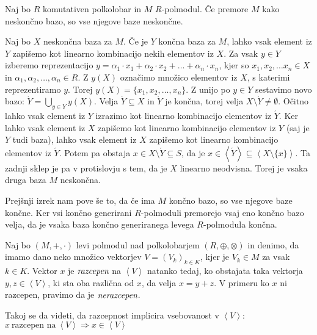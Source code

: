 \documentclass[mat1]{fmfdelo}
\newcommand{\pojem}[1]{\ensuremath{\emph{#1}}}
\newcommand{\Gen}[1]{\ensuremath{\left<{#1}\right>}}
\begin{document}
\begin{izrek}
	Naj bo $R$ komutativen polkolobar in $M$ $R$-polmodul. Če premore $M$ kako neskončno bazo, so vse njegove baze neskončne.
\end{izrek}
\begin{dokaz}
	Naj bo $X$ neskončna baza za $M$. Če je $Y$ končna baza za $M$, lahko vsak element iz $Y$ zapišemo kot linearno kombinacijo nekih elementov iz $X$. Za vsak $y\in Y$ izberemo reprezentacijo $y = \alpha_1\cdot x_1 + \alpha_2\cdot x_2 + \ldots + \alpha_n\cdot x_n$, kjer so $x_1, x_2, \ldots x_n \in X$ in $\alpha_1, \alpha_2, \ldots, \alpha_n \in R$. Z $y(X)$ označimo množico elementov iz $X$, s katerimi reprezentiramo $y$. Torej $y(X) = \{x_1, x_2, \ldots, x_n\}$. Z unijo po $y\in Y$ sestavimo novo bazo: $\acute{Y} = \bigcup_{y\in Y}y(X)$. Velja $\acute{Y} \subseteq X$ in $\acute{Y}$ je končna, torej velja $X\setminus\acute{Y}\neq\emptyset$. Očitno lahko vsak element iz $Y$ izrazimo kot linearno kombinacijo elementov iz $\acute{Y}$. Ker lahko vsak element iz $X$ zapišemo kot linearno kombinacijo elementov iz $Y$ (saj je $Y$ tudi baza), lahko vsak element iz $X$ zapišemo kot linearno kombinacijo elementov iz $\acute{Y}$. Potem pa obstaja $x\in X\setminus\acute{Y} \subseteq S$, da je $x\in \Gen{\acute{Y}}\subseteq\Gen{X\setminus\{x\}}$. Ta zadnji sklep je pa v protislovju s tem, da je $X$ linearno neodvisna. Torej je vsaka druga baza $M$ neskončna.
\end{dokaz}

\begin{opomba}\label{opomb:končgenbaz}
	Prejšnji izrek nam pove še to, da če ima $M$ končno bazo, so vse njegove baze končne. Ker vsi končno generirani $R$-polmoduli premorejo vsaj eno končno bazo velja, da je vsaka baza končno generiranega levega $R$-polmodula končna.
\end{opomba}



\begin{definicija}
	Naj bo $(M, +,\cdot)$ levi polmodul nad polkolobarjem $(R, \oplus, \otimes)$ in denimo, da imamo dano neko množico vektorjev $V = (V_k)_{k\in K}$, kjer je $V_k\in M$ za vsak $k\in K$. Vektor $x$ je \pojem{razcepen} na \Gen{V} natanko tedaj, ko obstajata taka vektorja $y, z\in \Gen{V}$, ki sta oba različna od $x$, da velja $x = y + z$. V primeru ko $x$ ni razcepen, pravimo da je \pojem{nerazcepen}.
\end{definicija}

\begin{opomba}
	Takoj se da videti, da razcepnost implicira vsebovanost v \Gen{V}: $x~\text{razcepen na}~ \Gen{V}\Rightarrow x\in \Gen{V}$
\end{opomba}
\end{document}
